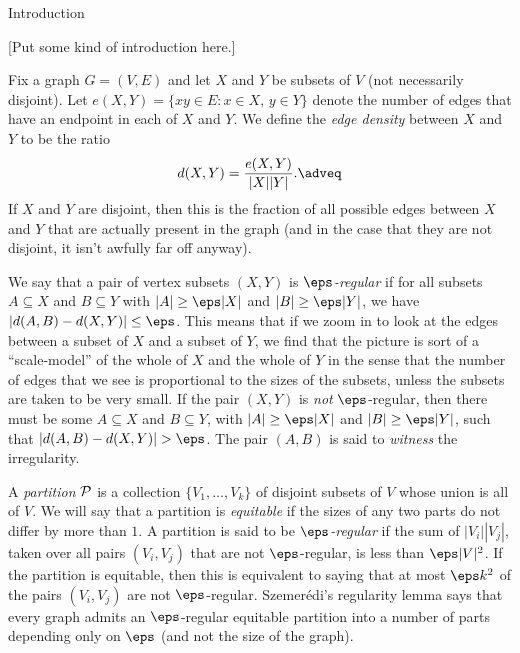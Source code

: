 


\def\P{{\cal P}}
\def\Q{{\cal Q}}
\def\R{{\cal R}}

\classicmode
{}

\advsect Introduction

[Put some kind of introduction here.]

Fix a graph $G=(V,E)$ and let $X$ and $Y$ be subsets of $V$ (not necessarily
disjoint). Let $e(X,Y) = \{xy \in E : x\in X,\,y\in Y\}$ denote the number of edges that have an endpoint
in each of $X$ and $Y$. We define the {\it edge density} between $X$ and $Y$ to be the ratio
$$d(X,Y) = {e(X,Y)\over |X||Y|}.\adveq$$
If $X$ and $Y$ are disjoint, then this is the fraction of all possible edges between $X$ and $Y$ that are
actually present in the graph (and in the case that they are not disjoint, it isn't awfully far off anyway).

We say that a pair of vertex subsets $(X,Y)$ is {\it $\eps$-regular} if for all subsets $A\subseteq X$ and
$B\subseteq Y$ with $|A|\geq \eps|X|$ and $|B|\geq \eps|Y|$, we have $|d(A,B)- d(X,Y)|\leq \eps$. This means that
if we zoom in to look at the edges between a subset of $X$ and a subset of $Y$, we find that the picture is sort of
a ``scale-model'' of the whole of $X$ and the whole of $Y$ in the sense that the number of edges that
we see is proportional to the sizes of the subsets, unless the subsets are taken to be very small. If the pair
$(X,Y)$ is {\it not} $\eps$-regular, then there must be some $A\subseteq X$ and $B\subseteq Y$, with
$|A|\geq \eps|X|$ and $|B| \geq \eps|Y|$, such that $|d(A,B)-d(X,Y)|>\eps$. The pair $(A,B)$ is said to
{\it witness} the irregularity.

A {\it partition} $\P$ is a collection $\{V_1,\ldots,V_k\}$ of disjoint subsets of $V$ whose union is all of $V$.
We will say that a partition is {\it equitable} if the sizes of any two parts do not differ by more than $1$.
A partition is said to be {\it $\eps$-regular} if the sum of $|V_i||V_j|$, taken over all pairs $(V_i,V_j)$
that are not $\eps$-regular, is less than $\eps |V|^2$. If the partition is equitable, then this is equivalent
to saying that at most $\eps k^2$ of the pairs $(V_i,V_j)$ are not $\eps$-regular. Szemer\'edi's regularity
lemma says that every graph admits an $\eps$-regular equitable partition into a number of parts depending
only on $\eps$ (and not the size of the graph).

